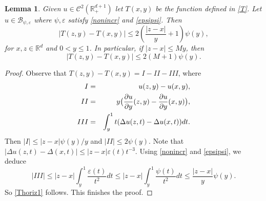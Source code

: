 \documentclass[11pt,letterpaper]{amsart}
\newtheorem{lem}{Lemma}[section]
\theoremstyle{definition}
\numberwithin{equation}{section}
\newcommand{\R}{\mathbb R}
\begin{document}
\begin{lem}\label{lemhor}
Given $u \in \mathcal{C}^2 (\R_+^{d+1})$ let $T(x,y)$ be the function defined in \eqref{T}. Let $u\in  \mathcal{B}_{\psi , \varepsilon }$ where $\psi , \varepsilon$ satisfy \eqref{nonincr} and \eqref{epsipsi}. Then   
\begin{equation}\label{Thoriz1}
|T(z,y) - T(x,y) | \leq 2 \left(\frac{|z-x|}{y} +1 \right) \psi (y), 
\end{equation}
for $x,z\in \R^d$ and $0 < y \leq 1$. In particular, if  $|z-x| \leq My$, then
\begin{equation}\label{Thoriz2}
|T(z,y) - T(x,y) | \leq 2(M+1)\psi (y) .
\end{equation}
\end{lem}
\begin{proof}
Observe that $T(z, y) - T(x,y) = I -II -III$, where
\begin{eqnarray*}
I & = & u(z,y) - u(x,y) , \vspace{0.14cm}\\
II & = & y\big ( \frac{\partial u}{\partial y}(z,y) - \frac{\partial u}{\partial y}(x,y) \big ) ,   \vspace{0.14cm} \\
III & = & \int_y^1 t( \Delta u(z,t) - \Delta u(x,t) ) dt . 
\end{eqnarray*}
Then $|I| \leq |z-x| \psi (y) / y $ and $|II| \leq 2 \psi (y)$. Note that $| \Delta u(z, t) - \Delta (x,t) | \leq |z-x| \varepsilon (t) t^{-3}$. Using \eqref{nonincr} and \eqref{epsipsi}, we deduce  
$$
|III|  \leq  |z-x| \int_y^1 \frac{\varepsilon (t)}{t^2} dt \leq  |z-x| \int_y^1 \frac{\psi (t)}{t^2} dt \leq \frac{|z-x|}{y} \psi (y) . 
$$
So \eqref{Thoriz1} follows. %
This finishes the proof. 
\end{proof}
\end{document}
